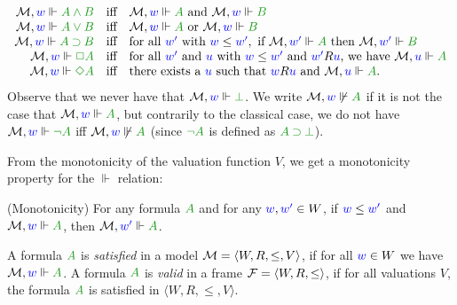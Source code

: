 \documentclass[a4paper]{article}
\begin{document}
 \begin{equation}\label{eq:kripke}
 \begin{array}{rcl}
 \M, \lb w \Vdash \fm{A \AND B} & \mbox{iff} & \M, \lb w \Vdash \fm A \mbox{ and } \M, \lb w \Vdash \fm B\\
 
 \M, \lb w \Vdash \fm{A \OR B} & \mbox{iff} & \M, \lb w \Vdash \fm A \mbox{ or } \M, \lb w \Vdash \fm B\\
 
 \M, \lb w \Vdash \fm{A \IMP B} & \mbox{iff} & \mbox{for all } \lb{w'} \mbox{ with } \futs w{w'}, \mbox{ if } \M, \lb{w'} \Vdash \fm A \mbox{ then } \M, \lb{w'} \Vdash \fm B\\
 
 \M, \lb w \Vdash \fm{\BOX A} & \mbox{iff} & \mbox{for all } \lb{w'} \mbox{ and } \lb u \mbox{ with } \futs w{w'} \mbox{ and } \accs {w'}u \mbox{, we have } \M, \lb u \Vdash \fm A \hfill \\ %
 
 \M, \lb w \Vdash \fm{\DIA A} & \mbox{iff} & \mbox{there exists a } \lb u \mbox{ such that } \accs wu \mbox{ and } \M, \lb u \Vdash \fm A.
 
 \end{array}
 \end{equation}
 Observe that we never have that $\M, \lb w \Vdash \fm\bot$. 
 We write $\M, \lb w \not\Vdash \fm A$ if it is not the case that $\M, \lb w \Vdash \fm A$, but contrarily to the classical case, we do not have $\M, \lb w \Vdash \fm{\neg A}$ iff $\M, \lb w \not\Vdash \fm A$ (since $\fm{\neg A}$ is defined as $\fm{A \IMP \bot}$).
 
 From the monotonicity of the valuation function $V$, we get a monotonicity property for the $\Vdash$ relation:
 \begin{proposition}(Monotonicity) 
 	For any formula $\fm A$ and for any ${\color{blue}{w}}, {\color{blue}{w'}} \in W$, if ${\color{blue}{w}}\le{{\color{blue}{w'}}}$ and $\M, \lb w \Vdash \fm A$, then $\M, \lb{w'} \Vdash \fm A$.
 \end{proposition}
 
 
 
 \begin{definition}
 	A formula $\fm A$ is \emph{satisfied} in a model $\mathcal{M} = \langle W, R, \le, V \rangle$, if for all ${\color{blue}{w}} \in W$ we have $\M, \lb w \Vdash \fm A$.
 	A formula $\fm A$ is \emph{valid} in a frame $\mathcal{F} = \langle W, R, \le \rangle$, if for all valuations $V$, the formula $\fm A$ is satisfied in $\langle W, R, \le, V \rangle$.
 \end{definition}
 
\end{document}
